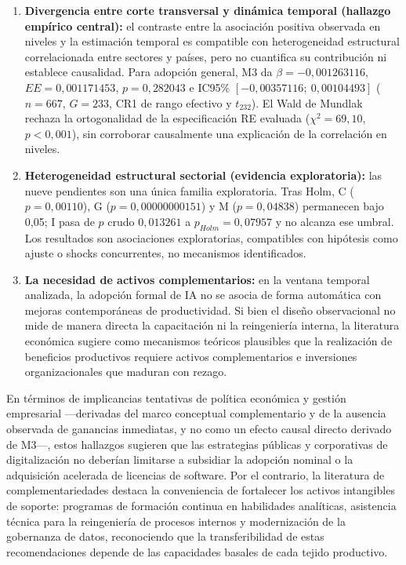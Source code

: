 \documentclass[12pt,a4paper]{article}
\begin{document}
\begin{enumerate}

    \item \textbf{Divergencia entre corte transversal y dinámica temporal (hallazgo empírico central):} el contraste entre la asociación positiva observada en niveles y la estimación temporal es compatible con heterogeneidad estructural correlacionada entre sectores y países, pero no cuantifica su contribución ni establece causalidad. Para adopción general, M3 da $\beta=-0,001263116$, $EE=0,001171453$, $p=0,282043$ e IC95\% $[-0,00357116;\ 0,00104493]$ ($n=667$, $G=233$, CR1 de rango efectivo y $t_{232}$). El Wald de Mundlak rechaza la ortogonalidad de la especificación RE evaluada ($\chi^2=69,10$, $p<0,001$), sin corroborar causalmente una explicación de la correlación en niveles.

    \item \textbf{Heterogeneidad estructural sectorial (evidencia exploratoria):} las nueve pendientes son una única familia exploratoria. Tras Holm, C ($p=0,00110$), G ($p=0,00000000151$) y M ($p=0,04838$) permanecen bajo 0,05; I pasa de $p$ crudo $0,013261$ a $p_{Holm}=0,07957$ y no alcanza ese umbral. Los resultados son asociaciones exploratorias, compatibles con hipótesis como ajuste o shocks concurrentes, no mecanismos identificados.

    \item \textbf{La necesidad de activos complementarios:} en la ventana temporal analizada, la adopción formal de IA no se asocia de forma automática con mejoras contemporáneas de productividad. Si bien el diseño observacional no mide de manera directa la capacitación ni la reingeniería interna, la literatura económica sugiere como mecanismos teóricos plausibles que la realización de beneficios productivos requiere activos complementarios e inversiones organizacionales que maduran con rezago.

\end{enumerate}

En términos de implicancias tentativas de política económica y gestión empresarial ---derivadas del marco conceptual complementario y de la ausencia observada de ganancias inmediatas, y no como un efecto causal directo derivado de M3---, estos hallazgos sugieren que las estrategias públicas y corporativas de digitalización no deberían limitarse a subsidiar la adopción nominal o la adquisición acelerada de licencias de software. Por el contrario, la literatura de complementariedades destaca la conveniencia de fortalecer los activos intangibles de soporte: programas de formación continua en habilidades analíticas, asistencia técnica para la reingeniería de procesos internos y modernización de la gobernanza de datos, reconociendo que la transferibilidad de estas recomendaciones depende de las capacidades basales de cada tejido productivo.
\end{document}
